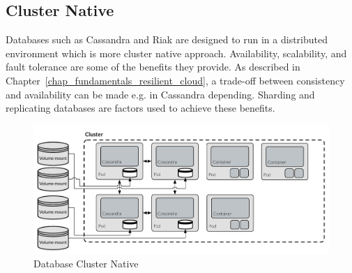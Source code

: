 \newpage
\subsection*{Cluster Native}
Databases such as Cassandra and Riak are designed to run in a distributed environment which is more cluster native approach. Availability, scalability, and fault tolerance are some of the benefits they provide. As described in Chapter~\ref{chap_fundamentals_resilient_cloud}, a trade-off between consistency and availability can be made e.g. in Cassandra depending. Sharding and replicating databases are factors used to achieve these benefits.

\begin{figure}
    \centering
    \includegraphics[width=\textwidth]{figures/appendix/database_cluster_native}
    \caption{Database Cluster Native}
    \label{fig:db_cluster_native}
\end{figure}

